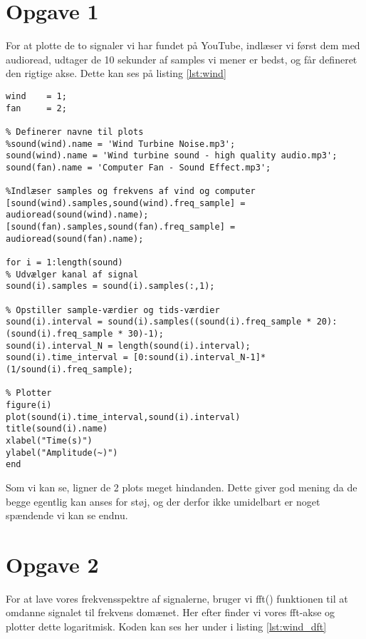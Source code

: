 \documentclass[../main.tex]{subfiles}
\begin{document}
\section{Opgave 1}

For at plotte de to signaler vi har fundet på YouTube, indlæser vi først dem med audioread, udtager de 10 sekunder af samples vi mener er bedst, og får defineret den rigtige akse. Dette kan ses på listing \ref{lst:wind}

\begin{lstlisting}[caption={Kode til at indlæse kvindmølle og computer blæsre lyde}, label={lst:wind}]
wind    = 1;
fan     = 2;

% Definerer navne til plots
%sound(wind).name = 'Wind Turbine Noise.mp3';
sound(wind).name = 'Wind turbine sound - high quality audio.mp3';
sound(fan).name = 'Computer Fan - Sound Effect.mp3';

%Indlæser samples og frekvens af vind og computer
[sound(wind).samples,sound(wind).freq_sample] = audioread(sound(wind).name);
[sound(fan).samples,sound(fan).freq_sample] = audioread(sound(fan).name);

for i = 1:length(sound)
% Udvælger kanal af signal
sound(i).samples = sound(i).samples(:,1);

% Opstiller sample-værdier og tids-værdier
sound(i).interval = sound(i).samples((sound(i).freq_sample * 20):(sound(i).freq_sample * 30)-1);
sound(i).interval_N = length(sound(i).interval);
sound(i).time_interval = [0:sound(i).interval_N-1]*(1/sound(i).freq_sample);

% Plotter
figure(i)
plot(sound(i).time_interval,sound(i).interval) 
title(sound(i).name)
xlabel("Time(s)")
ylabel("Amplitude(~)")
end
\end{lstlisting}



Som vi kan se, ligner de 2 plots meget hindanden. Dette giver god mening da de begge egentlig kan anses for støj, og der derfor ikke umidelbart er noget spændende vi kan se endnu.

\section{Opgave 2}

For at lave vores frekvensspektre af signalerne, bruger vi fft() funktionen til at omdanne signalet til frekvens domænet. Her efter finder vi vores fft-akse og plotter dette logaritmisk. Koden kan ses her under i listing \ref{lst:wind_dft}
\end{document}
